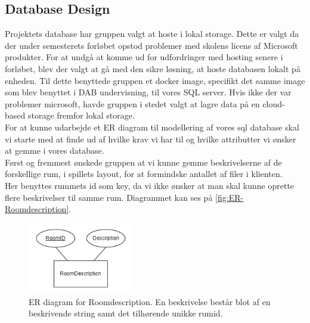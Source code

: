 \subsection{Database Design}
\label{ssec:DB Design}

Projektets database har gruppen valgt at hoste i lokal storage. Dette er valgt da der under semesterets forløbet opstod problemer med skolens licens af Microsoft produkter. For at undgå at komme ud for udfordringer med hosting senere i forløbet, blev der valgt at gå med den sikre løsning, at hoste databasen lokalt på enheden. Til dette benyttede gruppen et docker image\cite{SQL server with docker}, specifikt det samme image som blev benyttet i DAB undervisning, til vores SQL server.
Hvis ikke der var problemer microsoft, havde gruppen i stedet valgt at lagre data på en cloud-based storage fremfor lokal storage.\\

\noindent For at kunne udarbejde et ER diagram til modellering af vores sql database skal vi starte med at finde ud af hvilke krav vi har til og hvilke attributter vi ønsker at gemme i vores database.\\
Først og fremmest ønskede gruppen at vi kunne gemme beskrivelserne af de forskellige rum, i spillets layout, for at formindske antallet af filer i klienten.\\ 
Her benyttes rummets id som key, da vi ikke ønsker at man skal kunne oprette flere beskrivelser til samme rum. Diagrammet kan ses på \autoref{fig:ER-Roomdescription}.

\begin{figure}[H]
\centering
\includegraphics[width = 0.4\textwidth]{02-Body/Images/ER-RoomDescription.PNG}
\caption{ER diagram for Roomdescription. En beskrivelse består blot af en beskrivende string samt det tilhørende unikke rumid.}
\label{fig:ER-Roomdescription}
\end{figure}

